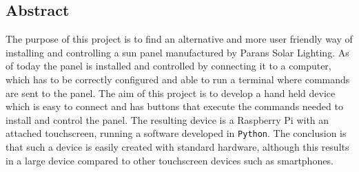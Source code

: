 \documentclass[a4paper]{article}
\begin{document}
    \subsection*{Abstract} %
    \label{sub:abstract}
            The purpose of this project is to find an alternative and more 
            user friendly way of installing and controlling a sun panel 
            manufactured by Parans Solar Lighting. As of today the panel is 
            installed and controlled by connecting it to a computer, 
            which has to be correctly configured and able to run a terminal 
            where commands are sent to the panel. The aim of this project is 
            to develop a hand held device which is easy to connect and has 
            buttons that execute the commands needed to install and control 
            the panel. The resulting device is a Raspberry Pi with an attached
            touchscreen, running a software developed in \texttt{Python}.  
            The conclusion is that such a device is easily created with standard hardware, although this results in a large device 
            compared to other touchscreen devices such as smartphones.
            
\end{document}
